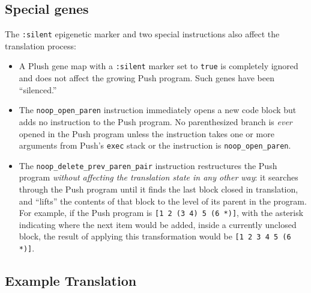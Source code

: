\documentclass[graybox]{svmult}
\begin{document}
\subsection{Special genes}
\label{special-instructions}

The \texttt{:silent} epigenetic marker and two special instructions also affect the translation process:

\begin{itemize}
\item
A Plush gene map with a \texttt{:silent} marker set to \texttt{true} is completely ignored and does not affect the growing Push program. Such genes have been ``silenced.''

\item
The  \texttt{noop\_open\_paren} instruction immediately opens a new code block but adds no instruction to the Push program. No parenthesized branch is \textit{ever} opened in the Push program unless the instruction takes one or more arguments from Push's \texttt{exec} stack or the instruction is \texttt{noop\_open\_paren}.

\item
The  \texttt{noop\_delete\_prev\_paren\_pair}  instruction restructures the Push program \textit{without affecting the translation state in any other way}: it searches through the Push program until it finds the last block closed in translation, and ``lifts'' the contents of that block to the level of its parent in the program. For example, if the Push program is \texttt{[1 2 (3 4) 5 (6 *)]}, with the asterisk indicating where the next item would be added, inside a currently unclosed block, the result of applying this transformation would be \texttt{[1 2 3 4 5 (6 *)]}.

\end{itemize}


\subsection{Example Translation}
\end{document}
